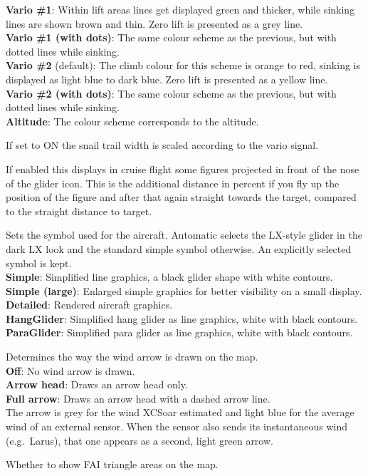 \begin{description}
  {\bf Vario \#1}: Within lift areas lines get displayed green and
  thicker, while sinking lines are shown brown and thin.  Zero lift
  is presented as a grey line. \\
  {\bf Vario \#1 (with dots)}: The same colour scheme as the previous, but with dotted 
  lines while sinking. \\
  {\bf Vario \#2} (default): The climb colour for this scheme is orange to red,
  sinking is displayed as light blue to dark blue. Zero lift is presented as a
  yellow line. \\
  {\bf Vario \#2 (with dots)}: The same colour scheme as the previous, but with dotted 
  lines while sinking. \\
  {\bf Altitude}: The colour scheme corresponds to the altitude.
\item[Trail scaled*] \label{conf:trailscaled} If set to ON the snail trail 
  width is scaled according to the vario signal.
\item[Detour cost markers*]  If enabled this displays in cruise flight some
  figures projected in front of the nose of the glider icon.  This is the
  additional distance in percent if you fly up the position of the figure and
  after that again straight towards the target, compared to the straight distance
  to target.
\item[Aircraft symbol*]  Sets the symbol used for the aircraft. Automatic
  selects the LX-style glider in the dark LX look and the standard simple
  symbol otherwise. An explicitly selected symbol is kept. \\
  {\bf Simple}: Simplified line graphics, a black glider shape with white contours. \\
  {\bf Simple (large)}: Enlarged simple graphics for better visibility on a small display. \\
  {\bf Detailed}: Rendered aircraft graphics. \\
  {\bf HangGlider}: Simplified hang glider as line graphics, white with black contours. \\
  {\bf ParaGlider}: Simplified para glider as line graphics, white with black contours.
\item[Wind arrow*]  Determines the way the wind arrow is drawn on the map. \\
  {\bf Off}: No wind arrow is drawn. \\
  {\bf Arrow head}: Draws an arrow head only. \\
  {\bf Full arrow}: Draws an arrow head with a dashed arrow line. \\
  The arrow is grey for the wind XCSoar estimated and light blue for
  the average wind of an external sensor.  When the sensor also sends
  its instantaneous wind (e.g.\ Larus), that one appears as a second,
  light green arrow.
\item[FAI triangle areas] Whether to show FAI triangle areas on the map.
  
\end{description}


